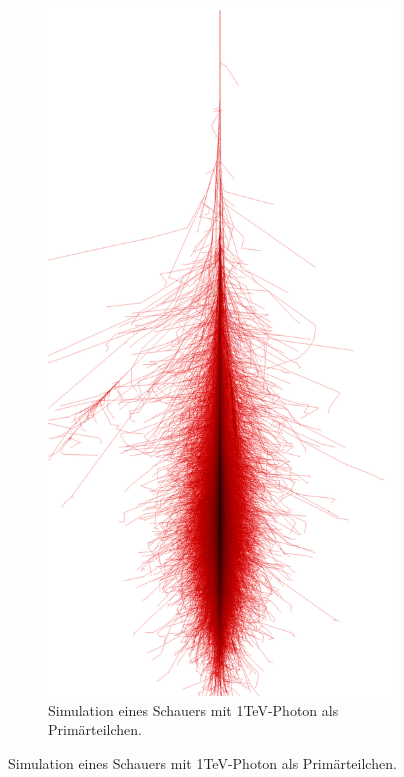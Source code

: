 \begin{figure}
 \begin{subfigure}{0.4\textwidth}
  \includegraphics[width=\textwidth]{./Plots/03_MonteCarlos/Photon_1TeV_CORSIKA.png}
  \caption{Simulation eines Schauers mit 1TeV-Photon als Primärteilchen.}

\end{subfigure}
\end{figure}
